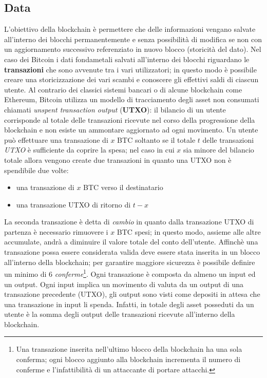 \subsection{Data}
L'obiettivo della blockchain è permettere che delle informazioni vengano salvate all'interno dei blocchi permanentemente e senza possibilità di modifica se non con un aggiornamento successivo referenziato in nuovo blocco (storicità del dato).\newline
Nel caso dei Bitcoin i dati fondametali salvati all'interno dei blocchi riguardano le \textbf{transazioni} che sono avvenute tra i vari utilizzatori; in questo modo è possibile creare una storicizzazione dei vari scambi e conoscere gli effettivi saldi di ciascun utente.\newline
Al contrario dei classici sistemi bancari o di alcune blockchain come Ethereum, Bitcoin utilizza un modello di tracciamento degli asset non consumati chiamati \textit{unspent transaction output} (\textbf{UTXO}): il bilancio di un utente corrisponde al totale delle transazioni ricevute nel corso della progressione della blockchain e non esiste un ammontare aggiornato ad ogni movimento.\newline
Un utente può effettuare una transazione di $x$ BTC soltanto se il totale $t$ delle transazioni \textit{UTXO} è sufficiente da coprire la spesa; nel caso in cui $x$ sia minore del bilancio totale allora vengono create due transazioni in quanto una UTXO non è spendibile due volte:
\begin{itemize}
    \item una transazione di $x$ BTC verso il destinatario
    \item una transazione UTXO di ritorno di $t-x$
\end{itemize}
La seconda transazione è detta di \textit{cambio} in quanto dalla transazione UTXO di partenza è necessario rimuovere i $x$ BTC spesi; in questo modo, assieme alle altre accumulate, andrà a diminuire il valore totale del conto dell'utente.\newline
Affinchè una transazione possa essere considerata valida deve essere stata inserita in un blocco all'interno della blockchain; per garantire maggiore sicurezza è possibile definire un minimo di 6 \textit{conferme}\footnote{Una transazione inserita nell'ultimo blocco della blockchain ha una sola conferma; ogni blocco aggiunto alla blockchain incrementa il numero di conferme e l'infattibilità di un attaccante di portare attacchi.}. Ogni transazione è composta da almeno un input ed un output. Ogni input implica un movimento di valuta da un output di una transazione precedente (UTXO), gli output sono visti come depositi in attesa che una transazione in input li spenda. Infatti, in totale degli asset posseduti da un utente è la somma degli output delle transazioni ricevute all'interno della blockchain.
